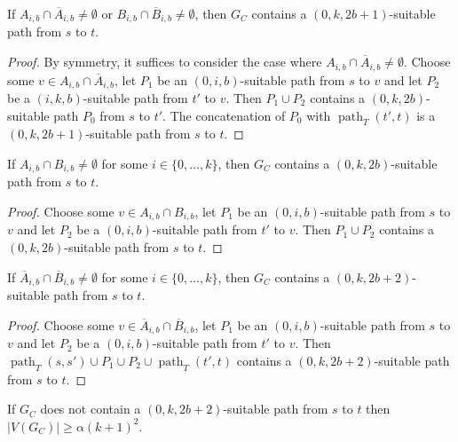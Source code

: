\documentclass{patmorin}
\DeclareMathOperator{\pth}{path}
\begin{document}
\begin{clm}\label{complement_connected}
  If $A_{i,b}\cap \overline{A}_{i,b}\neq\emptyset$ or $B_{i,b}\cap \overline{B}_{i,b}\neq\emptyset$, then $G_C$ contains a $(0,k,2b+1)$-suitable path from $s$ to $t$.
\end{clm}

\begin{proof}
  By symmetry, it suffices to consider the case where $A_{i,b}\cap \overline{A}_{i,b}\neq\emptyset$.  Choose some $v\in A_{i,b}\cap \overline{A}_{i,b}$, let $P_1$ be an $(0,i,b)$-suitable path from $s$ to $v$ and let $P_2$ be a $(i,k,b)$-suitable path from $t'$ to $v$.  Then $P_1\cup P_2$ contains a $(0,k,2b)$-suitable path $P_0$ from $s$ to $t'$.  The concatenation of $P_0$ with $\pth_T(t',t)$ is a $(0,k,2b+1)$-suitable path from $s$ to $t$.
\end{proof}

\begin{clm}\label{complement_connected}
  If $A_{i,b}\cap {B}_{i,b}\neq\emptyset$ for some $i\in\{0,\ldots,k\}$, then $G_C$ contains a $(0,k,2b)$-suitable path from $s$ to $t$.
\end{clm}

\begin{proof}
  Choose some $v\in A_{i,b}\cap B_{i,b}$, let $P_1$ be an $(0,i,b)$-suitable path from $s$ to $v$ and let $P_2$ be a $(0,i,b)$-suitable path from $t'$ to $v$.  Then $P_1\cup P_2$ contains a $(0,k,2b)$-suitable path from $s$ to $t$.
\end{proof}

\begin{clm}\label{complement_connected}
  If $\overline{A}_{i,b}\cap \overline{B}_{i,b}\neq\emptyset$ for some $i\in\{0,\ldots,k\}$, then $G_C$ contains a $(0,k,2b+2)$-suitable path from $s$ to $t$.
\end{clm}

\begin{proof}
  Choose some $v\in \overline{A}_{i,b}\cap \overline{B}_{i,b}$, let $P_1$ be an $(0,i,b)$-suitable path from $s$ to $v$ and let $P_2$ be a $(0,i,b)$-suitable path from $t'$ to $v$.  Then $\pth_T(s,s')\cup P_1\cup P_2\cup\pth_T(t',t)$ contains a $(0,k,2b+2)$-suitable path from $s$ to $t$.
\end{proof}


\begin{lem}
  If $G_C$ does not contain a $(0,k,2b+2)$-suitable path from $s$ to $t$ then $|V(G_C)|\ge \alpha (k+1)^2$.
\end{lem}
\end{document}
